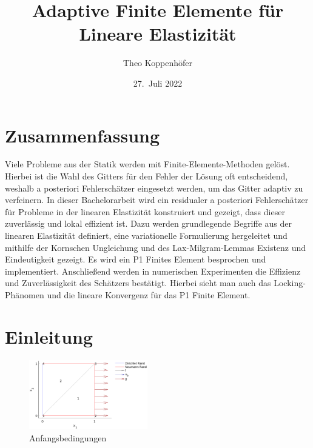 \documentclass{scrartcl}
\author{Theo Koppenhöfer}
\date{27.\ Juli 2022}
\title{Adaptive Finite Elemente für Lineare Elastizität}
\begin{document}
\maketitle

\tableofcontents

\thispagestyle{empty}

\newpage

\setcounter{page}{1}

\section*{Zusammenfassung}

Viele Probleme aus der Statik werden mit Finite-Elemente-Methoden gelöst. Hierbei ist die Wahl des Gitters für den Fehler der Lösung oft entscheidend, weshalb a posteriori Fehlerschätzer eingesetzt werden, um das Gitter adaptiv zu verfeinern. In dieser Bachelor\-arbeit wird ein residualer a posteriori Fehlerschätzer für Probleme in der linearen Elastizität konstruiert und gezeigt, dass dieser zuverlässig und lokal effizient ist. Dazu werden grundlegende Begriffe aus der linearen Elastizität definiert, eine variationelle Formulierung hergeleitet und mithilfe der Kornschen Ungleichung und des Lax-Milgram-Lemmas Existenz und Eindeutigkeit gezeigt. Es wird ein P1 Finites Element besprochen und implementiert. Anschließend werden in numerischen Experimenten die Effizienz und Zuverlässigkeit des Schätzers bestätigt. Hierbei sieht man auch das Locking-Phänomen und die lineare Konvergenz für das P1 Finite Element.


\section{Einleitung}

\begin{figure}
\centering
\vspace*{-1.3cm}
\includegraphics[width=0.46\textwidth]{Plots/PullBoxInitial2}
\vspace*{-1.2cm}
\caption{Anfangsbedingungen}
\label{pl:PullBoxInitial}
\end{figure}
\end{document}

